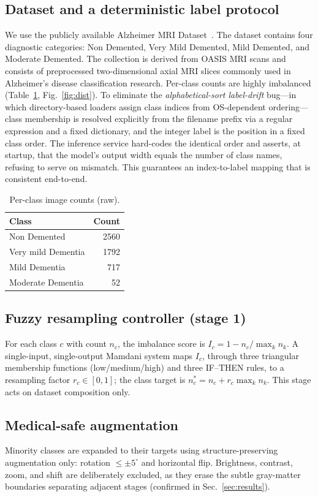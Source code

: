 \documentclass[journal]{IEEEtran}
\begin{document}
\subsection{Dataset and a deterministic label protocol}
We use the publicly available Alzheimer MRI Dataset~\cite{9}. The dataset contains
four diagnostic categories: Non Demented, Very Mild Demented,
Mild Demented, and Moderate Demented. The collection is derived
from OASIS MRI scans and consists of preprocessed two-dimensional
axial MRI slices commonly used in Alzheimer's disease
classification research. Per-class counts are highly imbalanced
(Table~\ref{tab:counts}, Fig.~\ref{fig:dist}). To eliminate the \emph{alphabetical-sort label-drift}
bug---in which directory-based loaders assign class indices from OS-dependent
ordering---class membership is resolved explicitly from the filename prefix via a
regular expression and a fixed dictionary, and the integer label is the position
in a fixed class order. The inference service hard-codes the identical order and
asserts, at startup, that the model's output width equals the number of class
names, refusing to serve on mismatch. This guarantees an index-to-label mapping
that is consistent end-to-end.

\begin{table}[t]
\centering
\caption{Per-class image counts (raw).}
\label{tab:counts}
\begin{tabular}{lr}
\toprule
Class & Count \\
\midrule
Non Demented & 2560 \\
Very mild Dementia & 1792 \\
Mild Dementia & 717 \\
Moderate Dementia & 52 \\
\bottomrule
\end{tabular}
\end{table}

\subsection{Fuzzy resampling controller (stage 1)}
For each class $c$ with count $n_c$, the imbalance score is
$I_c = 1 - n_c / \max_k n_k$. A single-input, single-output Mamdani system maps
$I_c$, through three triangular membership functions (low/medium/high) and three
IF--THEN rules, to a resampling factor $r_c\in[0,1]$; the class target is
$n_c^{\ast} = n_c + r_c\max_k n_k$. This stage acts on dataset composition only.

\subsection{Medical-safe augmentation}
Minority classes are expanded to their targets using structure-preserving
augmentation only: rotation $\leq\pm5^\circ$ and horizontal flip. Brightness,
contrast, zoom, and shift are deliberately excluded, as they erase the subtle
gray-matter boundaries separating adjacent stages (confirmed in
Sec.~\ref{sec:results}).
\end{document}
